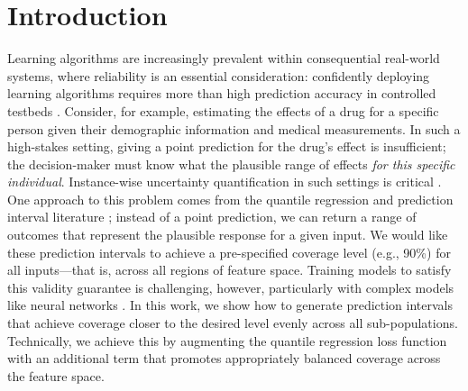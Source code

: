\documentclass{article}
\begin{document}
\section{Introduction}
Learning algorithms are increasingly prevalent within consequential real-world systems, where reliability is an essential consideration: confidently deploying learning algorithms requires more than high prediction accuracy in controlled testbeds \cite{intro_to_unc_quant, uncertainty_quant}.
Consider, for example, estimating the effects of a drug for a specific person given their demographic information and medical measurements. In such a high-stakes setting, giving a point prediction for the drug's effect is insufficient; the decision-maker must know what the plausible range of effects \emph{for this specific individual}. Instance-wise uncertainty quantification in such settings is critical \cite{drug_unc_quant, MRI_unc_quant, osti_1561669}. One approach to this problem comes from the quantile regression and prediction interval literature \cite{QR, flexible_pred_bands, quantile_regression_forests}; instead of a point prediction, we can return a range of outcomes that represent the plausible response for a given input. We would like these prediction intervals to achieve a pre-specified coverage level (e.g., 90\%) for all inputs---that is, across all regions of feature space. Training models to satisfy this validity guarantee is challenging, however, particularly with complex models like neural networks \cite{quantile_regression, deep_qr_right_censoring}. In this work, we show how to generate prediction intervals that achieve coverage closer to the desired level evenly across all sub-populations. Technically, we achieve this by augmenting the quantile regression loss function with an additional term that promotes appropriately balanced coverage across the feature space.
\end{document}
